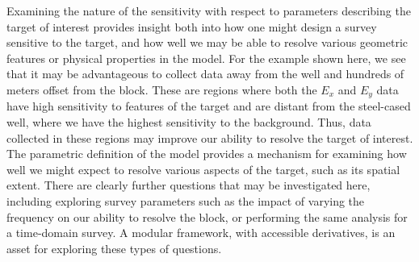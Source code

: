 \documentclass[preprint,review,3p,times,onecolumn,authoryear]{elsarticle}
\begin{document}
Examining the nature of the sensitivity with respect to parameters
describing the target of interest provides insight both into how one might
design a survey sensitive to the target, and how well we may be able to
resolve various geometric features or physical properties in the model.
For the example shown here, we see that it may be advantageous to collect data away from the
well and hundreds of meters offset from the block. These are regions where both the
$E_x$ and $E_y$ data have high sensitivity to features of the target
and are distant from the steel-cased well, where we have the highest sensitivity to the background.
Thus, data collected in
these regions may improve our ability to resolve the target of interest.
The parametric definition of the model provides a mechanism for examining how well we might expect
to resolve various aspects of the target, such as its spatial extent.
There are clearly further questions that may be investigated here, including
exploring survey parameters such as the impact of varying the frequency on our
ability to resolve the block, or performing the same analysis for a time-domain survey.
A modular framework, with accessible derivatives, is an asset for exploring
these types of questions.




\end{document}

